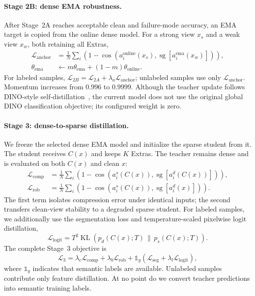 \documentclass[10pt,twocolumn,letterpaper]{article}
\newcommand{\sg}{\operatorname{sg}}
\begin{document}
\paragraph{Stage 2B: dense EMA robustness.}
After Stage~2A reaches acceptable clean and failure-mode accuracy, an EMA target is copied from the online dense model.
For a strong view $x_s$ and a weak view $x_w$, both retaining all Extras,
\begin{align}
\mathcal L_{\mathrm{anchor}}&=\frac{1}{N}\sum_i
\left(1-\cos(a_i^{\mathrm{online}}(x_s),
\sg[a_i^{\mathrm{ema}}(x_w)])\right),\\
\theta_{\mathrm{ema}}&\leftarrow m\theta_{\mathrm{ema}}+(1-m)\theta_{\mathrm{online}}.
\end{align}
For labeled samples, $\mathcal L_{2B}=\mathcal L_{2A}+\lambda_a\mathcal L_{\mathrm{anchor}}$; unlabeled samples use only $\mathcal L_{\mathrm{anchor}}$.
Momentum increases from $0.996$ to $0.9999$.
Although the teacher update follows DINO-style self-distillation~\cite{caron2021dino}, the current model does not use the original global DINO classification objective; its configured weight is zero.

\paragraph{Stage 3: dense-to-sparse distillation.}
We freeze the selected dense EMA model and initialize the sparse student from it.
The student receives $C(x)$ and keeps $K$ Extras.
The teacher remains dense and is evaluated on both $C(x)$ and clean $x$:
\begin{align}
\mathcal L_{\mathrm{comp}} &= \frac{1}{N}\sum_i
\left(1-\cos(a_i^s(C(x)),\sg[a_i^d(C(x))])\right),\\
\mathcal L_{\mathrm{rob}} &= \frac{1}{N}\sum_i
\left(1-\cos(a_i^s(C(x)),\sg[a_i^d(x)])\right).
\end{align}
The first term isolates compression error under identical inputs; the second transfers clean-view stability to a degraded sparse student.
For labeled samples, we additionally use the segmentation loss and temperature-scaled pixelwise logit distillation,
\begin{equation}
\mathcal L_{\mathrm{logit}}=T^2\operatorname{KL}
\left(p_d(C(x);T)\,\|\,p_s(C(x);T)\right).
\end{equation}
The complete Stage~3 objective is
\begin{equation}
\mathcal L_3=\lambda_c\mathcal L_{\mathrm{comp}}+
\lambda_b\mathcal L_{\mathrm{rob}}+
\mathbb 1_y\left(\mathcal L_{\mathrm{seg}}+
\lambda_l\mathcal L_{\mathrm{logit}}\right),
\label{eq:stage3}
\end{equation}
where $\mathbb 1_y$ indicates that semantic labels are available.
Unlabeled samples contribute only feature distillation.
At no point do we convert teacher predictions into semantic training labels.
\end{document}
